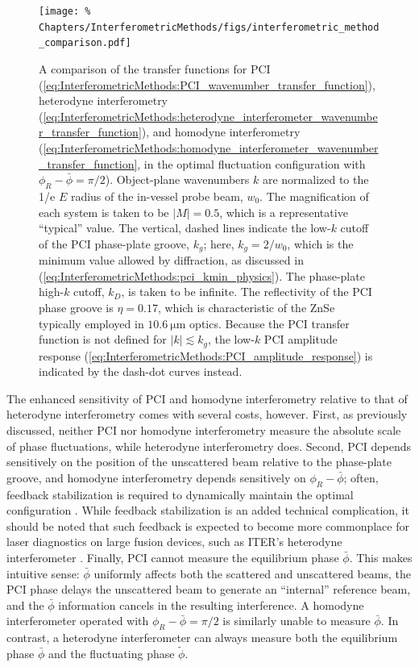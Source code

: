 \begin{figure}
  \centering
  \texttt{[image: \%
    Chapters/InterferometricMethods/figs/interferometric\_method\_comparison.pdf]}
  \caption[Comparison of interferometric-method transfer functions]{%
    A comparison of the transfer functions for
    PCI
    (\ref{eq:InterferometricMethods:PCI_wavenumber_transfer_function}),
    heterodyne interferometry
    (\ref{eq:InterferometricMethods:heterodyne_interferometer_wavenumber_transfer_function}),
    and homodyne interferometry
    (\ref{eq:InterferometricMethods:homodyne_interferometer_wavenumber_transfer_function},
    in the optimal fluctuation configuration
    with $\phi_R - \bar{\phi} = \pi / 2$).
    Object-plane wavenumbers $k$ are normalized
    to the 1/e $E$ radius of the in-vessel probe beam, $w_0$.
    The magnification of each system is taken to be $|M| = 0.5$,
    which is a representative ``typical'' value.
    The vertical, dashed lines indicate
    the low-$k$ cutoff of the PCI phase-plate groove, $k_g$;
    here, $k_g = 2 / w_0$,
    which is the minimum value allowed by diffraction,
    as discussed in
    (\ref{eq:InterferometricMethods:pci_kmin_physics}).
    The phase-plate high-$k$ cutoff, $k_D$,
    is taken to be infinite.
    The reflectivity of the PCI phase groove is $\eta = 0.17$,
    which is characteristic of the ZnSe typically
    employed in $\SI{10.6}{\micro\meter}$ optics.
    Because the PCI transfer function is not defined for $|k| \lesssim k_g$,
    the low-$k$ PCI amplitude response
    (\ref{eq:InterferometricMethods:PCI_amplitude_response})
    is indicated by the dash-dot curves instead.
  }
\label{fig:InterferometricMethods:interferometric_method_transfer_functions}
\end{figure}

The enhanced sensitivity of PCI and homodyne interferometry
relative to that of heterodyne interferometry
comes with several costs, however.
First, as previously discussed,
neither PCI nor homodyne interferometry
measure the absolute scale of phase fluctuations, while
heterodyne interferometry does.
Second, PCI depends sensitively on the position
of the unscattered beam relative to the phase-plate groove, and
homodyne interferometry depends sensitively on $\phi_R - \bar{\phi}$;
often, feedback stabilization is required
to dynamically maintain the optimal configuration
\cite[Ch.~3.5]{coda_phd}\cite{nazikian_rsi87}.
While feedback stabilization is an added technical complication,
it should be noted that such feedback
is expected to become more commonplace
for laser diagnostics on large fusion devices,
such as ITER's heterodyne interferometer
\cite{vanzeeland_TIP_rsi13}.
Finally, PCI cannot measure the equilibrium phase $\bar{\phi}$.
This makes intuitive sense:
$\bar{\phi}$ uniformly affects both the scattered and unscattered beams,
the PCI phase delays the unscattered beam
to generate an ``internal'' reference beam, and
the $\bar{\phi}$ information cancels in the resulting interference.
A homodyne interferometer operated with $\phi_R - \bar{\phi} = \pi / 2$
is similarly unable to measure $\bar{\phi}$.
In contrast, a heterodyne interferometer
can always measure both the equilibrium phase $\bar{\phi}$ and
the fluctuating phase $\tilde{\phi}$.


